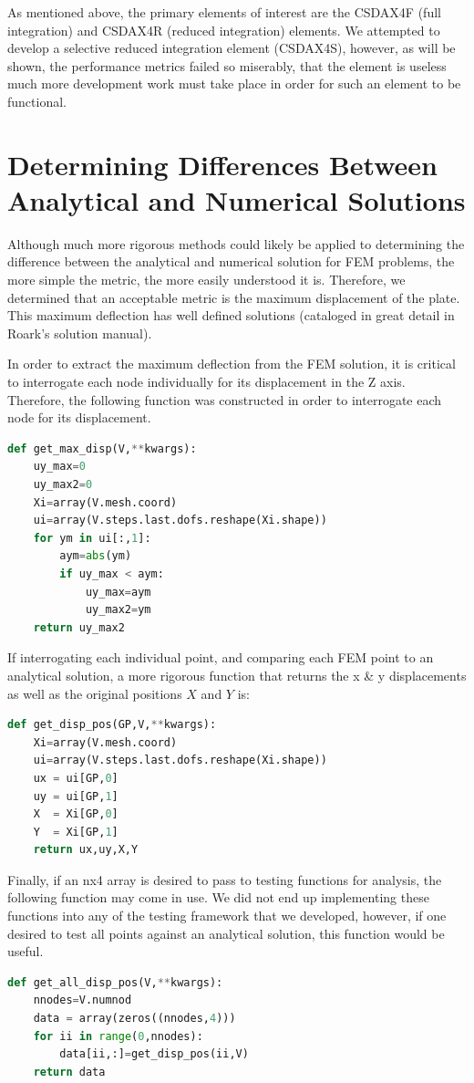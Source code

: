 \documentclass[10pt,letterpaper]{report}
\numberwithin{equation}{chapter}
\begin{document}
As mentioned above, the primary elements of interest are the CSDAX4F (full integration) and CSDAX4R (reduced integration) elements. We attempted to develop a selective reduced integration element (CSDAX4S), however, as will be shown, the performance metrics failed so miserably, that the element is useless much more development work must take place in order for such an element to be functional. 

\section{Determining Differences Between Analytical and Numerical Solutions}
Although much more rigorous methods could likely be applied to determining the difference between the analytical and numerical solution for FEM problems, the more simple the metric, the more easily understood it is. Therefore, we determined that an acceptable metric is the maximum displacement of the plate. This maximum deflection has well defined solutions (cataloged in great detail in Roark's solution manual). 

In order to extract the maximum deflection from the FEM solution, it is critical to interrogate each node individually for its displacement in the Z axis. Therefore, the following function was constructed in order to interrogate each node for its displacement.
\begin{lstlisting}[language=Python]
def get_max_disp(V,**kwargs):
    uy_max=0
    uy_max2=0
    Xi=array(V.mesh.coord)
    ui=array(V.steps.last.dofs.reshape(Xi.shape))
    for ym in ui[:,1]:
        aym=abs(ym)
        if uy_max < aym:
            uy_max=aym
            uy_max2=ym
    return uy_max2
\end{lstlisting}

If interrogating each individual point, and comparing each FEM point to an analytical solution, a more rigorous function that returns the x \& y displacements as well as the original positions $X$ and $Y$ is:
\begin{lstlisting}[language=Python]
def get_disp_pos(GP,V,**kwargs):
    Xi=array(V.mesh.coord)
    ui=array(V.steps.last.dofs.reshape(Xi.shape))
    ux = ui[GP,0]
    uy = ui[GP,1]
    X  = Xi[GP,0]
    Y  = Xi[GP,1]
    return ux,uy,X,Y
\end{lstlisting}

Finally, if an nx4 array is desired to pass to testing functions for analysis, the following function may come in use. We did not end up implementing these functions into any of the testing framework that we developed, however, if one desired to test all points against an analytical solution, this function would be useful.
\begin{lstlisting}[language=Python]
def get_all_disp_pos(V,**kwargs):
    nnodes=V.numnod
    data = array(zeros((nnodes,4)))
    for ii in range(0,nnodes):
        data[ii,:]=get_disp_pos(ii,V)
    return data
\end{lstlisting}
\end{document}
